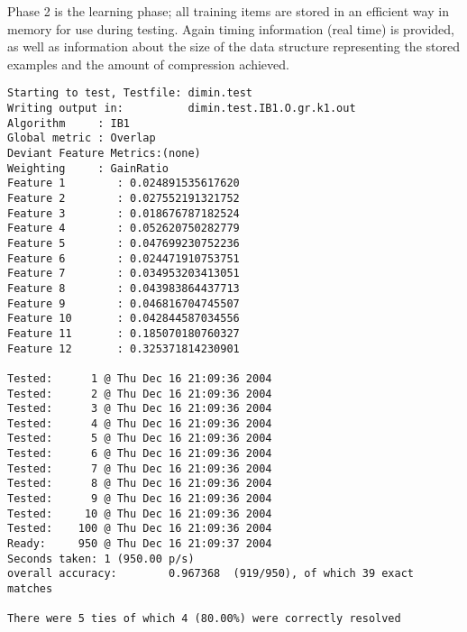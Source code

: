 \documentclass{report}
\begin{document}


Phase 2 is the learning phase; all training items are stored in an
efficient way in memory for use during testing. Again timing
information (real time) is provided, as well as information about the
size of the data structure representing the stored examples and the
amount of compression achieved. 



{\footnotesize
\begin{verbatim}
Starting to test, Testfile: dimin.test
Writing output in:          dimin.test.IB1.O.gr.k1.out
Algorithm     : IB1
Global metric : Overlap
Deviant Feature Metrics:(none)
Weighting     : GainRatio
Feature 1        : 0.024891535617620
Feature 2        : 0.027552191321752
Feature 3        : 0.018676787182524
Feature 4        : 0.052620750282779
Feature 5        : 0.047699230752236
Feature 6        : 0.024471910753751
Feature 7        : 0.034953203413051
Feature 8        : 0.043983864437713
Feature 9        : 0.046816704745507
Feature 10       : 0.042844587034556
Feature 11       : 0.185070180760327
Feature 12       : 0.325371814230901

Tested:      1 @ Thu Dec 16 21:09:36 2004
Tested:      2 @ Thu Dec 16 21:09:36 2004
Tested:      3 @ Thu Dec 16 21:09:36 2004
Tested:      4 @ Thu Dec 16 21:09:36 2004
Tested:      5 @ Thu Dec 16 21:09:36 2004
Tested:      6 @ Thu Dec 16 21:09:36 2004
Tested:      7 @ Thu Dec 16 21:09:36 2004
Tested:      8 @ Thu Dec 16 21:09:36 2004
Tested:      9 @ Thu Dec 16 21:09:36 2004
Tested:     10 @ Thu Dec 16 21:09:36 2004
Tested:    100 @ Thu Dec 16 21:09:36 2004
Ready:     950 @ Thu Dec 16 21:09:37 2004
Seconds taken: 1 (950.00 p/s)
overall accuracy:        0.967368  (919/950), of which 39 exact matches 

There were 5 ties of which 4 (80.00%) were correctly resolved
\end{verbatim}
}


\end{document}
